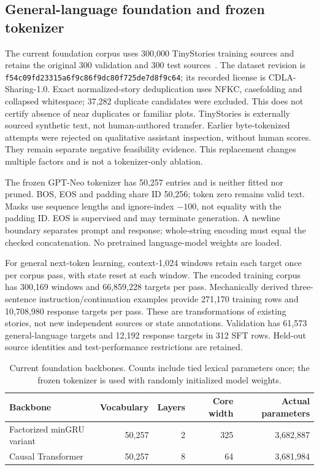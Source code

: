 \subsection{General-language foundation and frozen tokenizer}
The current foundation corpus uses 300,000 TinyStories training sources and
retains the original 300 validation and 300 test sources~\cite{tiny}. The dataset
revision is \texttt{f54c09fd23315a6f9c86\allowbreak f9dc80f725de7d8f9c64}; its
recorded license is CDLA-Sharing-1.0. Exact normalized-story deduplication uses
NFKC, casefolding and collapsed whitespace; 37,282 duplicate candidates were
excluded. This does not certify absence of near duplicates or familiar plots.
TinyStories is externally sourced synthetic text, not human-authored transfer.
Earlier byte-tokenized attempts were rejected on qualitative assistant
inspection, without human scores. They remain separate negative feasibility
evidence. This replacement changes
multiple factors and is not a tokenizer-only ablation.

The frozen GPT-Neo tokenizer has 50,257 entries and is neither fitted nor
pruned. BOS, EOS and padding share ID 50,256; token zero remains valid text.
Masks use sequence lengths and ignore-index $-100$, not equality with the
padding ID. EOS is supervised and may terminate generation. A newline boundary
separates prompt and response; whole-string encoding must equal the checked
concatenation. No pretrained language-model weights are loaded.

For general next-token learning, context-1,024 windows retain each target once
per corpus pass, with state reset at each window. The encoded training corpus
has 300,169 windows and 66,859,228 targets per pass. Mechanically derived
three-sentence instruction/continuation examples provide 271,170 training rows
and 10,708,980 response targets per pass. These are transformations of existing
stories, not new independent sources or state annotations. Validation has
61,573 general-language targets and 12,192 response targets in 312 SFT rows.
Held-out source identities and test-performance restrictions are retained.

\begin{table}[ht]\centering\small
\caption{Current foundation backbones. Counts include tied lexical parameters
once; the frozen tokenizer is used with randomly initialized model weights.}
\begin{tabular}{lrrrr}\toprule
Backbone & Vocabulary & Layers & Core width & Actual parameters\\\midrule
Factorized minGRU variant & 50,257 & 2 & 325 & 3,682,887\\
Causal Transformer & 50,257 & 8 & 64 & 3,681,984\\
\bottomrule\end{tabular}\end{table}

